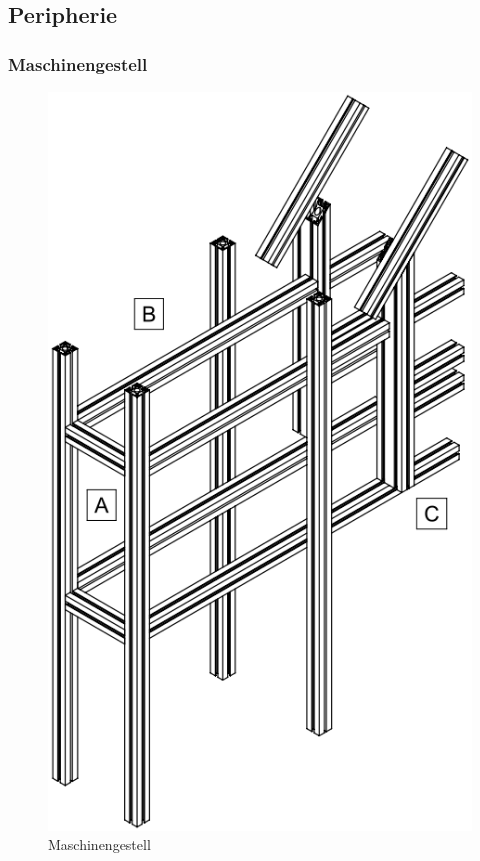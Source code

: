 \subsection{Peripherie}

\subsubsection{Maschinengestell}
\label{maschinengestell}
\begin{figure}
	\includegraphics[scale=0.41]{Illustrationen/6-Umsetzung/maschinengestell.PNG}
	\caption{Maschinengestell}
	\label{fig:maschinengestell}
\end{figure}


